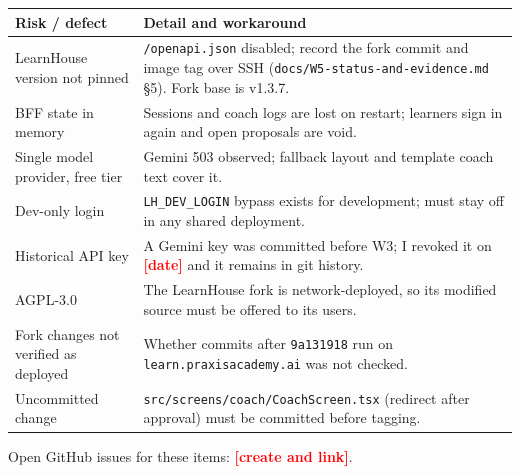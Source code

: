 \documentclass[11pt,a4paper]{article}
\newcommand{\fillin}[1]{\textcolor{red}{\textbf{[#1]}}}
\newcommand{\fp}[1]{\nolinkurl{#1}}
\begin{document}
\begin{xltabular}{\textwidth}{L{0.27\textwidth}Y}
\toprule
\textbf{Risk / defect} & \textbf{Detail and workaround} \\
\midrule
LearnHouse version not pinned & \texttt{/openapi.json} disabled; record the fork commit and image tag over SSH (\fp{docs/W5-status-and-evidence.md} §5). Fork base is v1.3.7. \\
BFF state in memory & Sessions and coach logs are lost on restart; learners sign in again and open proposals are void. \\
Single model provider, free tier & Gemini 503 observed; fallback layout and template coach text cover it. \\
Dev-only login & \texttt{LH\_DEV\_LOGIN} bypass exists for development; must stay off in any shared deployment. \\
Historical API key & A Gemini key was committed before W3; I revoked it on \fillin{date} and it remains in git history. \\
AGPL-3.0 & The LearnHouse fork is network-deployed, so its modified source must be offered to its users. \\
Fork changes not verified as deployed & Whether commits after \texttt{9a131918} run on \texttt{learn.praxisacademy.ai} was not checked. \\
Uncommitted change & \fp{src/screens/coach/CoachScreen.tsx} (redirect after approval) must be committed before tagging. \\
\bottomrule
\end{xltabular}
Open GitHub issues for these items: \fillin{create and link}.

\end{document}
